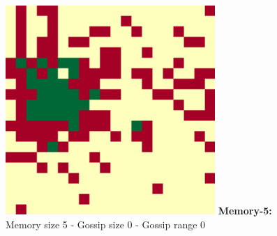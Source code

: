 \documentclass[english]{article}
\begin{document}
\begin{figure}[!hb]
{    \includegraphics[width=\textwidth/4]{spatial-memory0+gossip0+range0-C.pdf}
  }
  \textbf{Memory-5:} Memory size 5 - Gossip size 0 - Gossip range 0
\end{figure}
\end{document}
